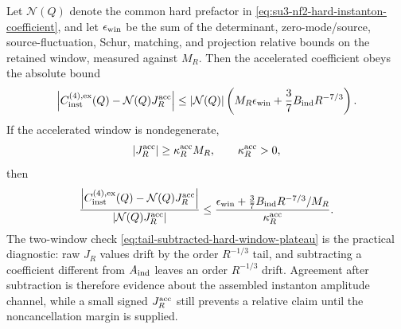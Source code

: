 \begin{controlledapproximation}
Let \(\mathcal N(Q)\) denote the common hard prefactor in
\eqref{eq:su3-nf2-hard-instanton-coefficient}, and let
\(\epsilon_{\rm win}\) be the sum of the determinant, zero-mode/source,
source-fluctuation, Schur, matching, and projection relative bounds on the
retained window, measured against \(M_R\).  Then the accelerated coefficient
obeys the absolute bound
\begin{equation}
  \left|
    C_{\rm inst}^{(4),{\rm ex}}(Q)
    -
    \mathcal N(Q)J_R^{\rm acc}
  \right|
  \le
  |\mathcal N(Q)|
  \left(
    M_R\epsilon_{\rm win}
    +
    \frac{3}{7}B_{\rm ind}R^{-7/3}
  \right).
  \label{eq:tail-subtracted-hard-window-absolute-bound}
\end{equation}
If the accelerated window is nondegenerate,
\[
  |J_R^{\rm acc}|\ge \kappa_R^{\rm acc}M_R,\qquad
  \kappa_R^{\rm acc}>0,
\]
then
\begin{equation}
  \frac{
  \left|
    C_{\rm inst}^{(4),{\rm ex}}(Q)
    -
    \mathcal N(Q)J_R^{\rm acc}
  \right|}
  {|\mathcal N(Q)J_R^{\rm acc}|}
  \le
  \frac{
    \epsilon_{\rm win}
    +
    \frac{3}{7}B_{\rm ind}R^{-7/3}/M_R}
  {\kappa_R^{\rm acc}} .
  \label{eq:tail-subtracted-hard-window-relative-bound}
\end{equation}
The two-window check
\eqref{eq:tail-subtracted-hard-window-plateau} is the practical diagnostic:
raw \(J_R\) values drift by the order \(R^{-1/3}\) tail, and subtracting a
coefficient different from \(A_{\rm ind}\) leaves an order \(R^{-1/3}\) drift.
Agreement after subtraction is therefore evidence about the assembled
instanton amplitude channel, while a small signed \(J_R^{\rm acc}\) still
prevents a relative claim until the noncancellation margin is supplied.
\end{controlledapproximation}

